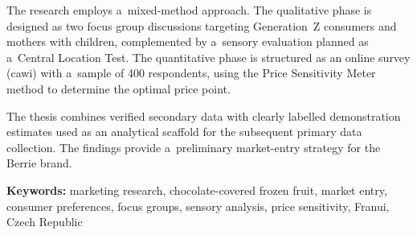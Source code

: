 The research employs a~mixed-method approach. The qualitative phase is designed as two focus group discussions targeting Generation~Z consumers and mothers with children, complemented by a~sensory evaluation planned as a~Central Location Test. The quantitative phase is structured as an online survey (\gls{cawi}) with a~sample of 400 respondents, using the Price Sensitivity Meter method to determine the optimal price point.

The thesis combines verified secondary data with clearly labelled demonstration estimates used as an analytical scaffold for the subsequent primary data collection. The findings provide a~preliminary market-entry strategy for the Berrie brand.

\vspace{5mm}
\noindent\textbf{Keywords:} marketing research, chocolate-covered frozen fruit, market entry, consumer preferences, focus groups, sensory analysis, price sensitivity, Franui, Czech Republic

\newpage
